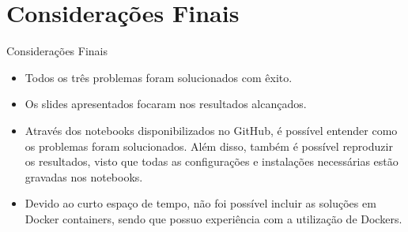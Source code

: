 \documentclass[xcolor=dvipsnames]{beamer}
\begin{document}
	\section{Considerações Finais}
	\begin{frame}{Considerações Finais}
		\begin{itemize}
			\item Todos os três problemas foram solucionados com êxito.
			\item Os slides apresentados focaram nos resultados alcançados.
			\item Através dos notebooks disponibilizados no GitHub, é possível entender como os problemas foram solucionados. Além disso, também é possível reproduzir os resultados, visto que todas as configurações e instalações necessárias estão gravadas nos notebooks.
			\item Devido ao curto espaço de tempo, não foi possível incluir as soluções em Docker containers, sendo que possuo experiência com a utilização de Dockers.
		\end{itemize}
	\end{frame}
	
\end{document}
